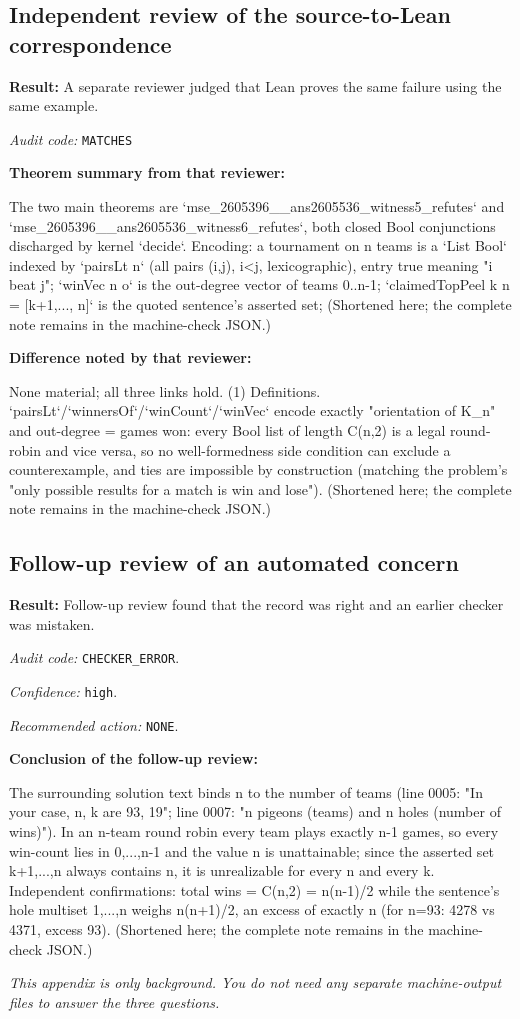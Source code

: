 \documentclass[11pt]{article}
\begin{document}
\subsection*{Independent review of the source-to-Lean correspondence}
\textbf{Result:} A separate reviewer judged that Lean proves the same failure using the same example.
\par\textit{Audit code:} \nolinkurl{MATCHES}
\par\textbf{Theorem summary from that reviewer:}
\begin{Vsrc}
The two main theorems are `mse_2605396__ans2605536_witness5_refutes` and `mse_2605396__ans2605536_witness6_refutes`, both closed Bool conjunctions discharged by kernel `decide`. Encoding: a tournament on n teams is a `List Bool` indexed by `pairsLt n` (all pairs (i,j), i<j, lexicographic), entry true meaning "i beat j"; `winVec n o` is the out-degree vector of teams 0..n-1; `claimedTopPeel k n = [k+1,..., n]` is the quoted sentence's asserted set; (Shortened here; the complete note remains in the machine-check JSON.)
\end{Vsrc}
\par\textbf{Difference noted by that reviewer:}
\begin{Vsrc}
None material; all three links hold. (1) Definitions. `pairsLt`/`winnersOf`/`winCount`/`winVec` encode exactly "orientation of K_n" and out-degree = games won: every Bool list of length C(n,2) is a legal round-robin and vice versa, so no well-formedness side condition can exclude a counterexample, and ties are impossible by construction (matching the problem's "only possible results for a match is win and lose"). (Shortened here; the complete note remains in the machine-check JSON.)
\end{Vsrc}
\subsection*{Follow-up review of an automated concern}
\textbf{Result:} Follow-up review found that the record was right and an earlier checker was mistaken.
\par\textit{Audit code:} \nolinkurl{CHECKER_ERROR}.\par\textit{Confidence:} \nolinkurl{high}.\par\textit{Recommended action:} \nolinkurl{NONE}.
\par\textbf{Conclusion of the follow-up review:}
\begin{Vsrc}
The surrounding solution text binds n to the number of teams (line 0005: "In your case, n, k are 93, 19"; line 0007: "n pigeons (teams) and n holes (number of wins)"). In an n-team round robin every team plays exactly n-1 games, so every win-count lies in {0,...,n-1} and the value n is unattainable; since the asserted set {k+1,...,n} always contains n, it is unrealizable for every n and every k. Independent confirmations: total wins = C(n,2) = n(n-1)/2 while the sentence's hole multiset {1,...,n} weighs n(n+1)/2, an excess of exactly n (for n=93: 4278 vs 4371, excess 93). (Shortened here; the complete note remains in the machine-check JSON.)
\end{Vsrc}
\textit{This appendix is only background. You do not need any separate machine-output files to answer the three questions.}
\end{document}
